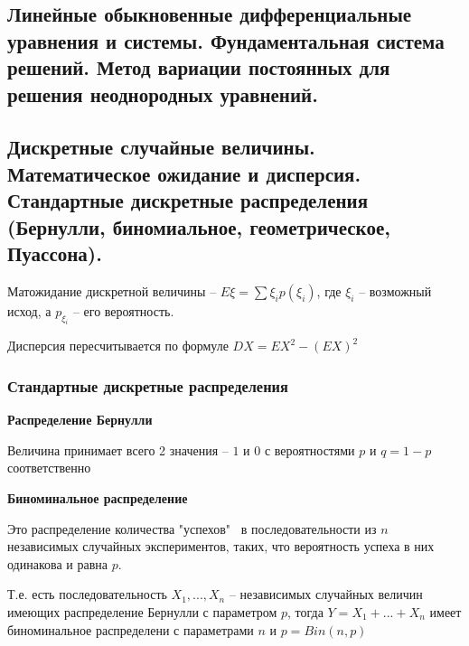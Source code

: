 \documentclass{article}
\begin{document}
\subsection{Линейные обыкновенные дифференциальные уравнения и системы. Фундаментальная система решений. Метод вариации постоянных для решения неоднородных уравнений.}

\subsection{Дискретные случайные величины. Математическое ожидание и дисперсия. Стандартные дискретные распределения (Бернулли, биномиальное, геометрическое, Пуассона).}




Матожидание дискретной величины -- $E\xi = \sum \xi_i p(\xi_i)$, где $\xi_i$ -- возможный исход, а $p_{\xi_i}$ -- его вероятность.

Дисперсия пересчитывается по формуле $DX = EX^2 - (EX)^2$

\subsubsection{ Стандартные дискретные распределения}

{\bf Распределение Бернулли}

Величина принимает всего 2 значения -- $1$ и $0$ с вероятностями $p$ и $q = 1 - p$ соответственно

{\bf Биноминальное распределение}

Это распределение количества "успехов" \ в последовательности из $n$ независимых случайных экспериментов, таких, что вероятность успеха в них одинакова и равна $p$.

Т.е. есть последовательность $X_1, ..., X_n$ -- независимых случайных величин имеющих распределение Бернулли с параметром $p$, тогда $Y = X_1 + ... + X_n$ имеет биноминальное распределени с параметрами $n$ и $p = Bin(n, p)$ 
\end{document}
